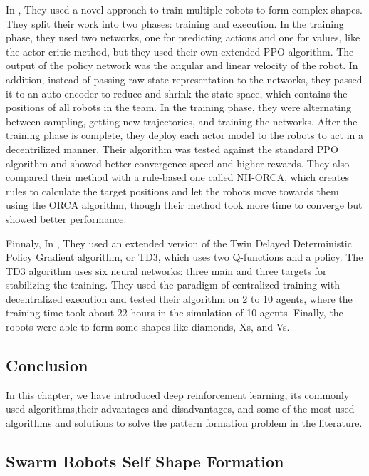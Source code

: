 \documentclass[12pt]{extarticle}
\begin{document}
In \cite{wang2019pattern}, They used a novel approach to train multiple robots to form complex shapes. They split their work into two phases: training and execution. In the training phase, they used two networks, one for predicting actions and one for values, like the actor-critic method, but they used their own extended PPO algorithm. The output of the policy network was the angular and linear velocity of the robot. In addition, instead of passing raw state representation to the networks, they passed it to an auto-encoder to reduce and shrink the state space, which contains the positions of all robots in the team. In the training phase, they were alternating between sampling, getting new trajectories, and training the networks. After the training phase is complete, they deploy each actor model to the robots to act in a decentrilized manner. Their algorithm was tested against the standard PPO algorithm and showed better convergence speed and higher rewards. They also compared their method with a rule-based one called NH-ORCA, which creates rules to calculate the target positions and let the robots move towards them using the ORCA algorithm, though their method took more time to converge but showed better performance.

Finnaly, In \cite{pan2022flexible}, They used an extended version of the Twin Delayed Deterministic Policy Gradient algorithm, or TD3, which uses two Q-functions and a policy. The TD3 algorithm uses six neural networks: three main and three targets for stabilizing the training. They used the paradigm of centralized training with decentralized execution and tested their algorithm on 2 to 10 agents, where the training time took about 22 hours in the simulation of 10 agents. Finally, the robots were able to form some shapes like diamonds, Xs, and Vs.


\subsection{Conclusion}
In this chapter, we have introduced deep reinforcement learning, its commonly used algorithms,their advantages and disadvantages, and some of the most used algorithms and solutions to solve the pattern formation problem in the literature.


 

  
  
  
\newpage
\pagebreak
\hspace{0pt}
\vfill
\begin{center}
\section{Swarm Robots Self Shape Formation}
\end{center}
\vfill
\hspace{0pt}
\end{document}
